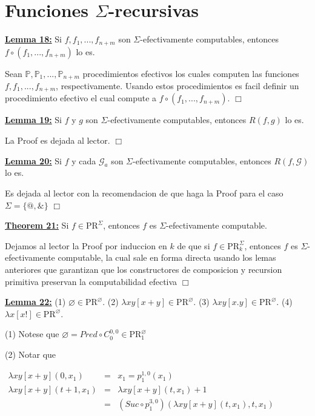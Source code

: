 \section{Funciones $\Sigma$-recursivas}

  \textbf{\underline{Lemma 18:}} Si \(f,f_{1},...,f_{n+m}\) son \(\Sigma \)-efectivamente computables, entonces \( f\circ (f_{1},...,f_{n+m})\) lo es.

  \PROOF Sean \(\mathbb{P},\mathbb{P}_{1},...,\mathbb{P}_{n+m}\) procedimientos efectivos los cuales computen las funciones \(f,f_{1},...,f_{n+m}\), respectivamente. Usando estos procedimientos es facil definir un procedimiento efectivo el cual compute a \(f\circ (f_{1},...,f_{n+m})\). \(\Box\)

  \textbf{\underline{Lemma 19:}} Si \(f\) y \(g\) son \(\Sigma \)-efectivamente computables, entonces \(R(f,g)\) lo es.

  \PROOF La Proof es dejada al lector. \(\Box\)

  \textbf{\underline{Lemma 20:}} Si \(f\) y cada \(\mathcal{G}_{a}\) son \(\Sigma \)-efectivamente computables, entonces \(R(f,\mathcal{G})\) lo es.

  \PROOF Es dejada al lector con la recomendacion de que haga la Proof para el caso \( \Sigma =\{@,\& \}\) \(\Box\)

  \textbf{\underline{Theorem 21:}} Si \(f\in \mathrm{PR}^{\Sigma }\), entonces \(f\) es \(\Sigma \)-efectivamente computable.

  \PROOF Dejamos al lector la Proof por induccion en \(k\) de que si \(f\in \mathrm{PR} _{k}^{\Sigma }\), entonces \(f\) es \(\Sigma \)-efectivamente computable, la cual sale en forma directa usando los lemas anteriores que garantizan que los constructores de composicion y recursion primitiva preservan la computabilidad efectiva \(\Box\)

  \textbf{\underline{Lemma 22:}}
  (1) \(\varnothing \in \mathrm{PR}^{\varnothing }\).
  (2) \(\lambda xy\left[ x+y\right] \in \mathrm{PR}^{\varnothing }\).
  (3) \(\lambda xy\left[ x.y\right] \in \mathrm{PR}^{\varnothing }\).
  (4) \(\lambda x\left[ x!\right] \in \mathrm{PR}^{\varnothing }\).

  \PROOF (1) Notese que \(\varnothing =Pred\circ C_{0}^{0,0}\in \mathrm{PR} _{1}^{\varnothing }\)

  (2) Notar que

  \(\displaystyle \begin{array}{rcl} \lambda xy\left[ x+y\right] (0,x_{1}) & =& x_{1}=p_{1}^{1,0}(x_{1}) \\ \lambda xy\left[ x+y\right] (t+1,x_{1}) & =& \lambda xy\left[ x+y\right] (t,x_{1})+1 \\ & =& \left( Suc\circ p_{1}^{3,0}\right) \left( \lambda xy\left[ x+y\right] (t,x_{1}),t,x_{1}\right) \end{array} \)

